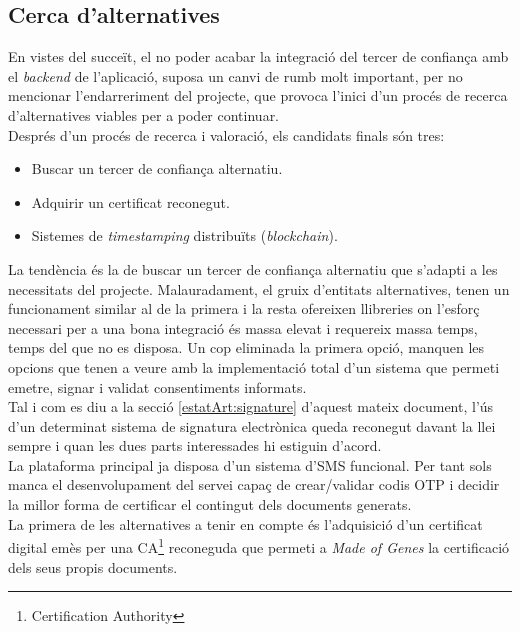 \subsection{Cerca d'alternatives}
\label{desenvolupament:alternatives}
En vistes del succeït, el no poder acabar la integració del tercer de confiança amb el \textit{backend} de l'aplicació, suposa un canvi de rumb molt important, per no mencionar l'endarreriment del projecte, que provoca l'inici d'un procés de recerca d'alternatives viables per a poder continuar.\\
\newline Després d'un procés de recerca i valoració, els candidats finals són tres:
\begin{itemize}
    \item Buscar un tercer de confiança alternatiu.
    \item Adquirir un certificat reconegut.
    \item Sistemes de \textit{timestamping} distribuïts (\textit{blockchain}).
\end{itemize}
La tendència és la de buscar un tercer de confiança alternatiu que s'adapti a les necessitats del projecte. Malauradament, el gruix d'entitats alternatives, tenen un funcionament similar al de la primera i la resta ofereixen llibreries on l'esforç necessari per a una bona integració és massa elevat i requereix massa temps, temps del que no es disposa.
\newline Un cop eliminada la primera opció, manquen les opcions que tenen a veure amb la implementació total d'un sistema que permeti emetre, signar i validat consentiments informats.\\
\newline Tal i com es diu a la secció \ref{estatArt:signature} d'aquest mateix document, l'ús d'un determinat sistema de signatura electrònica queda reconegut davant la llei sempre i quan les dues parts interessades hi estiguin d'acord.\\ La plataforma principal ja disposa d'un sistema d'SMS funcional. Per tant sols manca el desenvolupament del servei capaç de crear/validar codis OTP i decidir la millor forma de certificar el contingut dels documents generats.\\
\newline La primera de les alternatives a tenir en compte és l'adquisició d'un certificat digital emès per una CA\footnote{Certification Authority} reconeguda que permeti a \textit{Made of Genes} la certificació dels seus propis documents.\\
